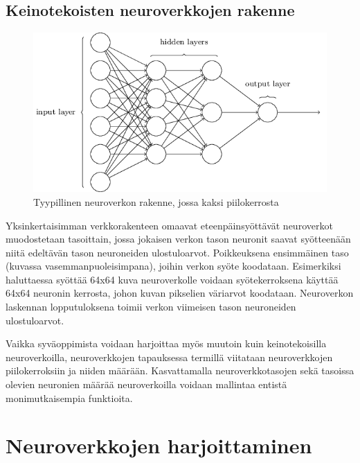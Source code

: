 \documentclass[finnish]{tktltiki2}
\theoremstyle{definition}
\theoremstyle{remark}
\begin{document}

  \subsection{Keinotekoisten neuroverkkojen rakenne}

  \begin{figure}[h]
    \centering
    \includegraphics[scale=0.5]{basic-neuralnet}
    \caption{Tyypillinen neuroverkon rakenne, jossa kaksi piilokerrosta \cite{Nielsen-neural}}
    \label{pic:neuralnet}
  \end{figure}

  Yksinkertaisimman verkkorakenteen omaavat eteenpäinsyöttävät neuroverkot muodostetaan tasoittain, jossa jokaisen verkon tason neuronit saavat syötteenään niitä edeltävän tason neuroneiden ulostuloarvot. Poikkeuksena ensimmäinen taso (kuvassa vasemmanpuoleisimpana), joihin verkon syöte koodataan. Esimerkiksi haluttaessa syöttää 64x64 kuva neuroverkolle voidaan syötekerroksena käyttää 64x64 neuronin kerrosta, johon kuvan pikselien väriarvot koodataan. Neuroverkon laskennan lopputuloksena toimii verkon viimeisen tason neuroneiden ulostuloarvot.

  Vaikka syväoppimista voidaan harjoittaa myös muutoin kuin keinotekoisilla neuroverkoilla, neuroverkkojen tapauksessa termillä viitataan neuroverkkojen piilokerroksiin ja niiden määrään. Kasvattamalla neuroverkkotasojen sekä tasoissa olevien neuronien määrää neuroverkoilla voidaan mallintaa entistä monimutkaisempia funktioita.

  \section{Neuroverkkojen harjoittaminen}
    \label{chap:neural-training}
\end{document}
